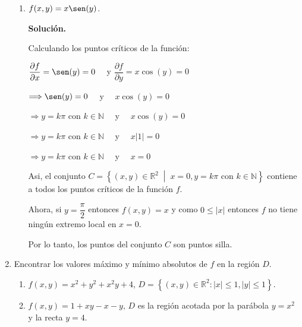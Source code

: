 \documentclass[fleqn, 12pt]{article}
\newcommand{\derivadaparcial}[2]{\dfrac{\partial {#1}}{\partial {#2}}}
\newcommand{\talque}{\; \middle | \;}
\begin{document}
\begin{enumerate}
\begin{enumerate}
            \item $ f(x,y) = x \sen (y) $.
            
            \textbf{Solución.}

            Calculando los puntos críticos de la función:

            $ \derivadaparcial{f}{x} = \sen (y) = 0 \quad $ y $ \derivadaparcial{f}{y} = x \cos (y) = 0 $

            $ \Longrightarrow \sen (y) = 0 \quad $ y $ \quad x \cos (y) = 0 $

            $ \Longrightarrow y = k \pi \text{ con } k \in \mathbb{N} \quad $ y $ \quad x \cos (y) = 0 $

            $ \Longrightarrow y = k \pi \text{ con } k \in \mathbb{N} \quad $ y $ \quad x \lvert 1 \rvert = 0 $

            $ \Longrightarrow y = k \pi \text{ con } k \in \mathbb{N} \quad $ y $ \quad x = 0 $

            Asi, el conjunto $ C = \left\lbrace (x,y) \in \mathbb{R}^2 \talque x = 0, y = k \pi \text{ con } k \in \mathbb{N} \right\rbrace $ contiene a todos los puntos críticos de la función $ f $.

            Ahora, si $ y = \dfrac{\pi}{2} $ entonces $ f(x,y) = x $ y como $ 0 \leq \lvert x \rvert $ entonces $ f $ no tiene ningún extremo local en $ x = 0 $. 
            
            Por lo tanto, los puntos del conjunto $ C $ son puntos silla.

        \end{enumerate}

        \item Encontrar los valores máximo y mínimo absolutos de $ f $ en la región $ D $.
        
        \begin{enumerate}
            \item $ f(x,y) = x^2 + y^2 + x^2 y + 4, \, D = \left\lbrace (x,y) \in \mathbb{R}^2 : \lvert x \rvert \leq 1, \lvert y \rvert \leq 1 \right\rbrace $.
            

            \item $ f(x,y) = 1 + xy - x - y, \, D $ es la región acotada por la parábola $ y = x^2 $ y la recta $ y = 4 $.
            


\end{enumerate}
\end{enumerate}
\end{document}
